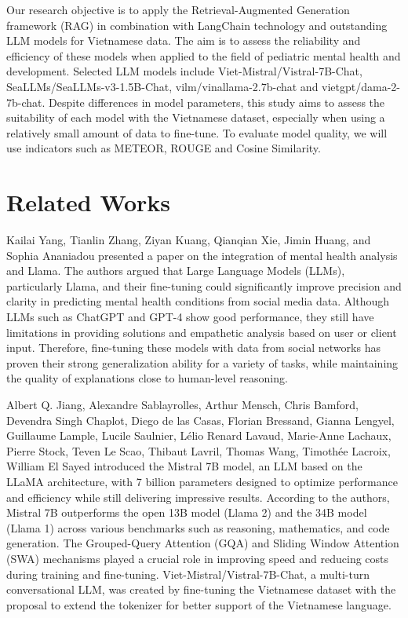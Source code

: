 \documentclass[conference]{IEEEtran}
\begin{document}
Our research objective is to apply the Retrieval-Augmented Generation framework (RAG) in combination with LangChain technology and outstanding LLM models for Vietnamese data. The aim is to assess the reliability and efficiency of these models when applied to the field of pediatric mental health and development. Selected LLM models include Viet-Mistral/Vistral-7B-Chat, SeaLLMs/SeaLLMs-v3-1.5B-Chat, vilm/vinallama-2.7b-chat and vietgpt/dama-2-7b-chat. Despite differences in model parameters, this study aims to assess the suitability of each model with the Vietnamese dataset, especially when using a relatively small amount of data to fine-tune. To evaluate model quality, we will use indicators such as METEOR, ROUGE and Cosine Similarity.

\section{Related Works}
\label{sec:Related Works}
Kailai Yang, Tianlin Zhang, Ziyan Kuang, Qianqian Xie, Jimin Huang, and Sophia Ananiadou \cite{b1} presented a paper on the integration of mental health analysis and Llama. The authors argued that Large Language Models (LLMs), particularly Llama, and their fine-tuning could significantly improve precision and clarity in predicting mental health conditions from social media data. Although LLMs such as ChatGPT and GPT-4 show good performance, they still have limitations in providing solutions and empathetic analysis based on user or client input. Therefore, fine-tuning these models with data from social networks has proven their strong generalization ability for a variety of tasks, while maintaining the quality of explanations close to human-level reasoning.

Albert Q. Jiang, Alexandre Sablayrolles, Arthur Mensch, Chris Bamford, Devendra Singh Chaplot, Diego de las Casas, Florian Bressand, Gianna Lengyel, Guillaume Lample, Lucile Saulnier, Lélio Renard Lavaud, Marie-Anne Lachaux, Pierre Stock, Teven Le Scao, Thibaut Lavril, Thomas Wang, Timothée Lacroix, William El Sayed \cite{b2} introduced the Mistral 7B model, an LLM based on the LLaMA architecture, with 7 billion parameters designed to optimize performance and efficiency while still delivering impressive results. According to the authors, Mistral 7B outperforms the open 13B model (Llama 2) and the 34B model (Llama 1) across various benchmarks such as reasoning, mathematics, and code generation. The Grouped-Query Attention (GQA) and Sliding Window Attention (SWA) mechanisms played a crucial role in improving speed and reducing costs during training and fine-tuning. Viet-Mistral/Vistral-7B-Chat, a multi-turn conversational LLM, was created by fine-tuning the Vietnamese dataset with the proposal to extend the tokenizer for better support of the Vietnamese language.
\end{document}
